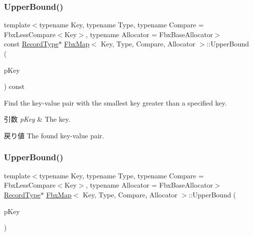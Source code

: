 \subsubsection{\texorpdfstring{Upper\+Bound()}{UpperBound()}\hspace{0.1cm}{\footnotesize\ttfamily [1/2]}}
{\footnotesize\ttfamily template$<$typename Key, typename Type, typename Compare = Fbx\+Less\+Compare$<$\+Key$>$, typename Allocator = Fbx\+Base\+Allocator$>$ \\
const \hyperlink{class_fbx_map_af8fc887461b3bf29f41aa36d15ddb54f}{Record\+Type}$\ast$ \hyperlink{class_fbx_map}{Fbx\+Map}$<$ Key, Type, Compare, Allocator $>$\+::Upper\+Bound (\begin{DoxyParamCaption}\item[{const \hyperlink{class_fbx_map_ad8392c83b6f8eeb9e0706bcc8674270a}{Key\+Type} \&}]{p\+Key }\end{DoxyParamCaption}) const}

Find the key-\/value pair with the smallest key greater than a specified key. 
\begin{DoxyParams}{引数}
{\em p\+Key} & The key. \\
\hline
\end{DoxyParams}
\begin{DoxyReturn}{戻り値}
The found key-\/value pair. 
\end{DoxyReturn}
\mbox{\label{class_fbx_map_aaaa41638bc860b13b3abc232d1db08e7}} 
\subsubsection{\texorpdfstring{Upper\+Bound()}{UpperBound()}\hspace{0.1cm}{\footnotesize\ttfamily [2/2]}}
{\footnotesize\ttfamily template$<$typename Key, typename Type, typename Compare = Fbx\+Less\+Compare$<$\+Key$>$, typename Allocator = Fbx\+Base\+Allocator$>$ \\
\hyperlink{class_fbx_map_af8fc887461b3bf29f41aa36d15ddb54f}{Record\+Type}$\ast$ \hyperlink{class_fbx_map}{Fbx\+Map}$<$ Key, Type, Compare, Allocator $>$\+::Upper\+Bound (\begin{DoxyParamCaption}\item[{const \hyperlink{class_fbx_map_ad8392c83b6f8eeb9e0706bcc8674270a}{Key\+Type} \&}]{p\+Key }\end{DoxyParamCaption})}

